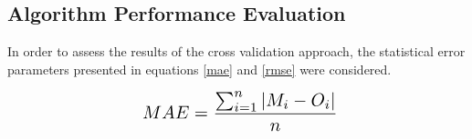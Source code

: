





\subsection{Algorithm Performance Evaluation}

In order to assess the results of the cross validation approach, the statistical error parameters presented in equations \eqref{mae} and \eqref{rmse} were considered.

\begin{equation} 
\label{mae}
\scalebox{1.4}{ $ MAE = \dfrac{\sum_{i=1}^{n} |M_i - O_i|}{n}$}
\end{equation}

